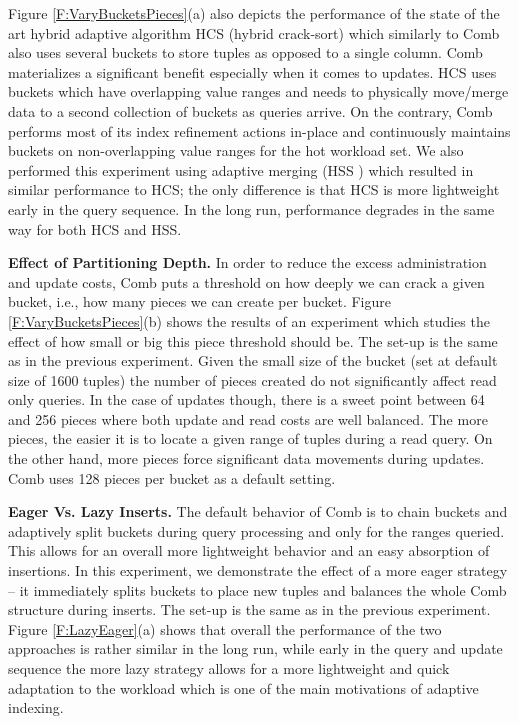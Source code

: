 Figure \ref{F:VaryBucketsPieces}(a) also depicts the performance of the state of the art hybrid adaptive 
algorithm HCS (hybrid crack-sort) which similarly to Comb also uses several buckets to store
tuples as opposed to a single column. Comb materializes a significant benefit especially when it comes 
to updates. HCS uses buckets which have overlapping value ranges and needs to physically move/merge data
to a second collection of buckets as queries arrive. On the contrary, Comb performs most of its 
index refinement actions in-place and continuously maintains buckets on non-overlapping value ranges
for the hot workload set. 
We also performed this experiment using adaptive merging (HSS \cite{AdaptiveIndexing}) which
resulted in similar performance to HCS; the only difference is that HCS is more lightweight
early in the query sequence. In the long run, performance degrades in the same way for both HCS and HSS. 



\textbf{Effect of Partitioning Depth.}
In order to reduce the excess administration and update costs, Comb puts a threshold on how deeply we can 
crack a given bucket, i.e., how many pieces we can create per bucket.
Figure \ref{F:VaryBucketsPieces}(b) shows the results of an experiment which studies the effect of 
how small or big this piece threshold should be.
The set-up is the same as in the previous experiment.
Given the small size of the bucket (set at default size of 1600 tuples) 
the number of pieces created do not significantly affect 
read only queries. In the case of updates though, there is a sweet point between 64 and 256 pieces
where both update and read costs are well balanced. The more pieces, the easier it is to locate 
a given range of tuples during a read query. On the other hand, more pieces force significant data movements
during updates. 
Comb uses 128 pieces per bucket as a default setting. 

\textbf{Eager Vs. Lazy Inserts.}
The default behavior of Comb is to chain buckets and adaptively split buckets 
during query processing and only for the ranges queried. 
This allows for an overall more lightweight behavior and an easy absorption of insertions.
In this experiment, we demonstrate the effect of a more eager strategy -- it
immediately splits buckets to place new tuples and balances the whole Comb structure during inserts.
The set-up is the same as in the previous experiment.
Figure \ref{F:LazyEager}(a) shows that overall the performance of the two approaches is rather similar in the long
run, while early in the query and update sequence the more lazy strategy allows for a more lightweight
and quick adaptation to the workload which is one of the main motivations of adaptive indexing.

